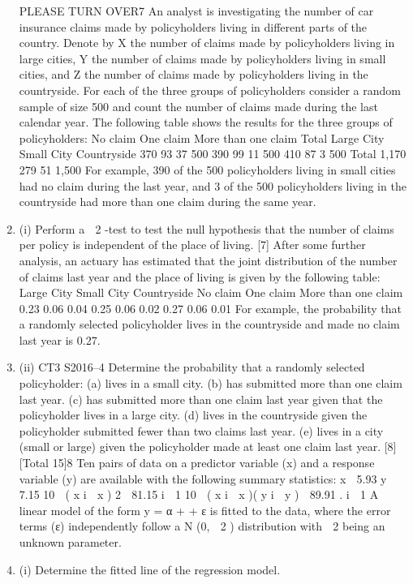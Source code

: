 \documentclass[a4paper,12pt]{article}
\begin{document}
\begin{enumerate}
PLEASE TURN OVER7
An analyst is investigating the number of car insurance claims made by policyholders
living in different parts of the country. Denote by X the number of claims made by
policyholders living in large cities, Y the number of claims made by policyholders
living in small cities, and Z the number of claims made by policyholders living in the
countryside. For each of the three groups of policyholders consider a random sample
of size 500 and count the number of claims made during the last calendar year.
The following table shows the results for the three groups of policyholders:
No claim
One claim
More than one claim
Total
Large City Small City Countryside
370
93
37
500 390
99
11
500 410
87
3
500
Total
1,170
279
51
1,500
For example, 390 of the 500 policyholders living in small cities had no claim during
the last year, and 3 of the 500 policyholders living in the countryside had more than
one claim during the same year.
\item (i)
Perform a  2 -test to test the null hypothesis that the number of claims per
policy is independent of the place of living.
[7]
After some further analysis, an actuary has estimated that the joint distribution of the
number of claims last year and the place of living is given by the following table:
Large City Small City Countryside
No claim
One claim
More than one claim
0.23
0.06
0.04
0.25
0.06
0.02
0.27
0.06
0.01
For example, the probability that a randomly selected policyholder lives in the
countryside and made no claim last year is 0.27.
\item (ii)
CT3 S2016–4
Determine the probability that a randomly selected policyholder:
(a) lives in a small city.
(b) has submitted more than one claim last year.
(c) has submitted more than one claim last year given that the policyholder
lives in a large city.
(d) lives in the countryside given the policyholder submitted fewer than
two claims last year.
(e) lives in a city (small or large) given the policyholder made at least one
claim last year.
[8]
[Total 15]8
Ten pairs of data on a predictor variable (x) and a response variable (y) are available
with the following summary statistics:
x  5.93 y  7.15
10
 ( x i  x ) 2  81.15
i  1
10
 ( x i  x )( y i  y )  89.91 .
i  1
A linear model of the form y = α + \betax + ε is fitted to the data, where the error
terms (ε) independently follow a N (0,  2 ) distribution with  2 being an unknown
parameter.
\item (i)
Determine the fitted line of the regression model.


\end{enumerate}
\end{document}
